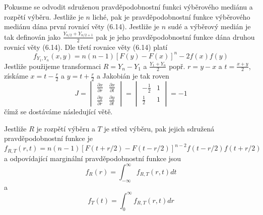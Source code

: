 Pokusme se odvodit sdruženou pravděpodobnostní funkci výběrového mediánu a rozpětí výběru. Jestliže je $n$ liché, pak je pravděpodobnostní funkce výběrového mediánu dána první rovnicí věty (6.14). Jestliže je $n$ sudé a výběrový medián je tak definován jako $\frac{Y_{n/2} + Y_{n/2 + 1}}{2}$ pak je jeho pravděpodobnostní funkce dána druhou rovnicí věty (6.14). Dle třetí rovnice věty (6.14) platí
\begin{equation*}
f_{Y_1, Y_n}(x,y) = n (n - 1)[F(y) - F(x)]^n-2 f(x)f(y)
\end{equation*}
Jestliže použijeme transformaci $R = Y_n - Y_1$ a $\frac{Y_1 + Y_n}{2}$ popř. $r = y - x$ a $t = \frac{x + y}{2}$, získáme $x = t - \frac{r}{2}$ a $y = t + \frac{r}{2}$ a Jakobián je tak roven
\begin{equation*}
J =
\begin{vmatrix}
\frac{\partial x}{\partial r} & \frac{\partial x}{\partial t}\\
\frac{\partial y}{\partial r} & \frac{\partial y}{\partial t}
\end{vmatrix}
=
\begin{vmatrix}
-\frac{1}{2} & 1\\
\frac{1}{2} & 1
\end{vmatrix}
= -1
\end{equation*}
čímž se dostáváme následující větě.

\begin{theorem}
Jestliže $R$ je rozpětí výběru a $T$ je střed výběru, pak jejich sdružená pravděpodobnostní funkce je
\begin{equation*}
f_{R, T}(r, t) = n(n - 1)[F(t + r/2) - F(t - r/2)]^{n - 2}f(t - r/2) f(t + r/2)
\end{equation*}
a odpovídající marginální pravděpodobnostní funkce jsou
\begin{equation*}
f_R(r) = \int_{-\infty}^{\infty} f_{R,T}(r, t)dt
\end{equation*}
a
\begin{equation*}
f_T(t) = \int_0^{\infty} f_{R,T}(r, t)dr
\end{equation*}
\end{theorem}

